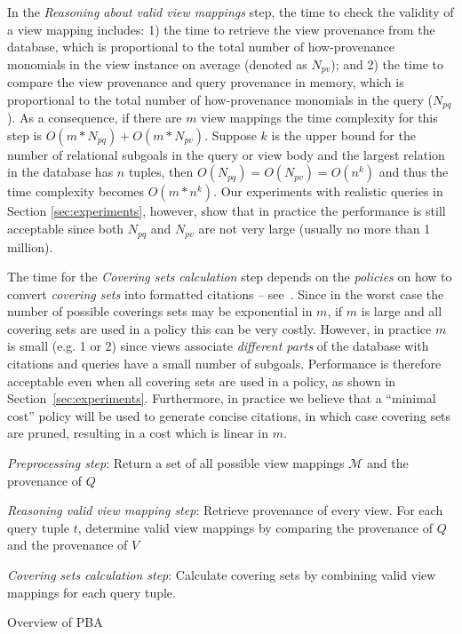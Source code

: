 In the {\em Reasoning about valid view mappings} step, 
the time to check the validity of a view mapping includes: 1) the time to retrieve the view provenance from the database, which is proportional to the total number of how-provenance monomials in the view instance on average (denoted as $N_{pv}$); and 2) the time to compare the view provenance and query provenance in memory, which is proportional to the total number of how-provenance monomials in the query ($N_{pq}$). As a consequence, if there are $m$ view mappings the time complexity for this step is $O(m*N_{pq}) + O(m*N_{pv})$. Suppose $k$ is the upper bound for the number of relational subgoals in the query or view body and the largest relation in the database has $n$ tuples, then $O(N_{pq}) = O(N_{pv}) = O(n^k)$ and thus the time complexity becomes $O(m*n^k)$.  Our experiments with realistic queries in Section \ref{sec:experiments}\eat{~\ref{ssec: realistic}}, however, show that in practice the performance is still acceptable since both $N_{pq}$ and $N_{pv}$ are not very large (usually no more than 1 million).


The time for the {\em Covering sets calculation} step depends on the {\em policies} on how to convert {\em covering sets} into formatted citations
-- see~\cite{wu2018data}.  
Since in the worst case the number of possible coverings sets may be exponential in $m$, if $m$ is large and all covering sets are used in a policy this can be very costly.  
However, in practice $m$ is small (e.g. 1 or 2) since views associate \textit{different parts} of the database with citations and queries have a small number of subgoals. Performance is therefore acceptable even when all covering sets are used in a policy, as shown in Section~\ref{sec:experiments}.  Furthermore, in practice we believe that a ``minimal cost'' policy will be used to generate concise citations, in which case covering sets are pruned,  resulting in a cost which is linear in $m$.


\begin{algorithm}[h!] 
\footnotesize


{\em Preprocessing step}: Return a set of all possible view mappings $\mathcal{M}$ and the provenance of $Q$

{\em Reasoning valid view mapping step}: Retrieve provenance of every view. For each query tuple $t$, determine valid view mappings by comparing the provenance of $Q$ and the provenance of $V$

{\em Covering sets calculation step}: Calculate covering sets by combining valid view mappings for each query tuple.
 \caption{Overview of PBA}
 \label{covering_sets_calculation}
 \end{algorithm}


